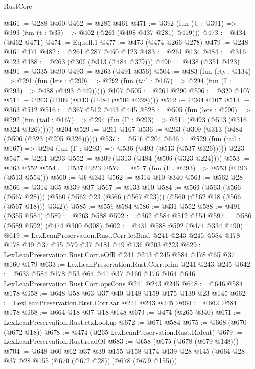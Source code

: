 \begin{lexlean}{RustCore}
\begin{coremodule}
@461 := @288 @460
@462 := @285 @461
@471 := @392 (fun (U : @391) => @393 (fun (t : @35) => @402 (@263 (@408 @437 @281) @419)))
@473 := @434 (@462 @471)
@474 := Eq.refl.{1}
@477 := @473 (@474 @266 @278)
@479 := @248 @461 @471
@482 := @261 @287 @460 @123
@483 := @261 @134
@484 := @316 @123
@488 := @263 (@309 (@313 (@484 @329)))
@490 := @438 (@351 @123)
@491 := @335 @490
@493 := @263 (@491 @356)
@504 := @483
    (fun (rty : @134) =>
    @291
      (fun (lets : @290) => @292 (fun (tail : @167) => @294 (fun (Γ : @293) => @488 (@493 @449)))))
    @107
@505 := @261 @290
@506 := @320 @107
@511 := @263 (@309 (@313 (@484 (@506 @328))))
@512 := @364 @107
@513 := @363 @512
@516 := @367 @512 @443 @445
@528 := @505
    (fun (lets : @290) =>
    @292 (fun (tail : @167) => @294 (fun (Γ : @293) => @511 (@493 (@513 (@516 @324 @326))))))
    @204
@529 := @261 @167
@536 := @263 (@309 (@313 (@484 (@506 (@323 (@205 @326))))))
@537 := @516 @204
@546 := @529 (fun (tail : @167) => @294 (fun (Γ : @293) => @536 (@493 (@513 (@537 @326))))) @223
@547 := @261 @293
@552 := @309 (@313 (@484 (@506 (@323 @224))))
@553 := @263 @552
@554 := @537 @223
@559 := @547 (fun (Γ : @293) => @553 (@493 (@513 @554)))
@560 := @6 @341
@562 := @314 @10 @340
@563 := @562 @28
@566 := @314 @35 @339 @37
@567 := @133 @10
@584 := @560
    (@563 (@566 (@567 @28)))
    (@560 (@562 @23 (@566 (@567 @23))) (@560 (@562 @18 (@566 (@567 @18))) @342))
@585 := @559 @584
@586 := @431 @552
@588 := @491 (@355 @584)
@589 := @263 @588
@592 := @362 @584 @512 @554
@597 := @586 (@589 @592) (@474 @300 @308)
@602 := @431 @588 @592 (@474 @334 @490)
@619 := LexLeanPreservation.Rust.Corr.letBind
    @241
    @243
    @245
    @584
    @178
    @178
    @49
    @37
    @65
    @79
    @37
    @181
    @49
    @136
    @203
    @223
@629 := LexLeanPreservation.Rust.Corr.eOfB @241 @243 @245 @584 @178 @65 @37 @160 @179
@633 := LexLeanPreservation.Rust.Corr.prim @241 @243 @245
@642 := @633 @584 @178 @53 @64 @41 @37 @160 @176 @164
@646 := LexLeanPreservation.Rust.Corr.opsCons @241 @243 @245
@648 := @646 @584 @178
@658 := @648 @58 @63 @37 @40 @148 @159 @175 @139 @23 @145
@662 := LexLeanPreservation.Rust.Corr.var @241 @243 @245
@664 := @662 @584 @178
@668 := @664 @18 @37 @18 @148
@670 := @474 (@265 @340)
@671 := LexLeanPreservation.Rust.ctxLookup
@672 := @671 @584
@675 := @668 (@670 (@672 @18))
@678 := @474 (@265 LexLeanPreservation.Rust.RIdent)
@679 := LexLeanPreservation.Rust.readOf
@683 := @658 (@675 (@678 (@679 @148)))
@704 := @648
    @60
    @62
    @37
    @39
    @155
    @158
    @174
    @139
    @28
    @145
    (@664 @28 @37 @28 @155 (@670 (@672 @28)) (@678 (@679 @155)))

\end{coremodule}
\end{lexlean}
